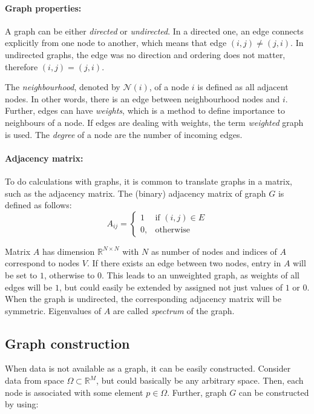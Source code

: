 \paragraph{Graph properties:}
A graph can be either \textit{directed} or \textit{undirected}. 
In a directed one, an edge connects explicitly from one node to another, which means that edge $(i, j) \neq (j, i)$. 
In undirected graphs, the edge was no direction and ordering does not matter, therefore $(i, j) = (j, i)$.

The \textit{neighbourhood}, denoted by $\mathcal{N}(i)$, of a node $i$  is defined as all adjacent nodes.
In other words, there is an edge between neighbourhood nodes and $i$. 
Further, edges can have \textit{weights}, which is a method to define importance to neighbours of a node.
If edges are dealing with weights, the term \textit{weighted} graph is used.
The \textit{degree} of a node are the number of incoming edges.

\paragraph{Adjacency matrix:}
To do calculations with graphs, it is common to translate graphs in a matrix, 
such as the adjacency matrix.
The (binary) adjacency matrix of graph $G$ is defined as follows:
\begin{equation}
    \label{eg:AdjacencyMatrix}
    A_{ij} =    
    \begin{cases}
        1  & \text{if } (i, j) \in E \\
        0, & \text{otherwise}
    \end{cases}
\end{equation}

Matrix $A$ has dimension $\mathbb{R}^{N \times N}$ with $N$ as number of nodes
and indices of $A$ correspond to nodes $V$.
If there exists an edge between two nodes, entry in $A$ will be set to $1$, otherwise to $0$.
This leads to an unweighted graph, as weights of all edges will be $1$, 
but could easily be extended by assigned not just values of $1$ or $0$. 
When the graph is undirected, the corresponding adjacency matrix will be symmetric. 
Eigenvalues of $A$ are called \textit{spectrum} of the graph.


\subsection{Graph construction}
\label{sec:graphConstruction}
When data is not available as a graph, it can be easily constructed.
Consider data from space $\Omega \subset \mathbb{R}^M $, but could basically be any arbitrary space.
Then, each node is associated with some element $p \in \Omega$. 
Further, graph $G$ can be constructed by using:

